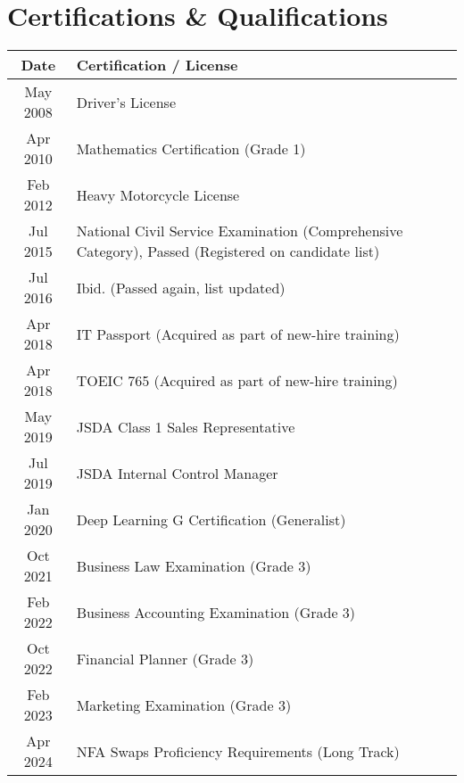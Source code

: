 \documentclass[uplatex,a4j,10.5pt,dvipdfmx]{jsarticle}
\begin{document}
\section*{Certifications \& Qualifications}

\begin{longtable}{|c|l|}
	\hline
	\centering\textbf{Date} & \textbf{Certification / License}                                                                   \\
	\hline
	\endhead

	\hline
	May 2008                & Driver's License                                                                                   \\
	\hline
	Apr 2010                & Mathematics Certification (Grade 1)                                                                \\
	\hline
	Feb 2012                & Heavy Motorcycle License                                                                           \\
	\hline
	Jul 2015                & National Civil Service Examination (Comprehensive Category), Passed (Registered on candidate list) \\
	\hline
	Jul 2016                & Ibid. (Passed again, list updated)                                                                 \\
	\hline
	Apr 2018                & IT Passport (Acquired as part of new-hire training)                                                \\
	\hline
	Apr 2018                & TOEIC 765 (Acquired as part of new-hire training)                                                  \\
	\hline
	May 2019                & JSDA Class 1 Sales Representative                                                                  \\
	\hline
	Jul 2019                & JSDA Internal Control Manager                                                                      \\
	\hline
	Jan 2020                & Deep Learning G Certification (Generalist)                                                         \\
	\hline
	Oct 2021                & Business Law Examination (Grade 3)                                                                 \\
	\hline
	Feb 2022                & Business Accounting Examination (Grade 3)                                                          \\
	\hline
	Oct 2022                & Financial Planner (Grade 3)                                                                        \\
	\hline
	Feb 2023                & Marketing Examination (Grade 3)                                                                    \\
	\hline
	Apr 2024                & NFA Swaps Proficiency Requirements (Long Track)                                                    \\
	\hline
\end{longtable}
\end{document}
